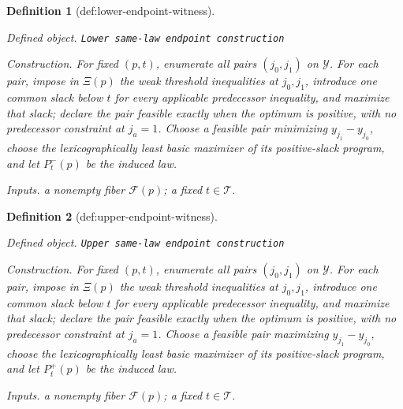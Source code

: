 \documentclass{article}
\newtheorem{definition}{Definition}
\begin{document}
\begin{definition}[def:lower-endpoint-witness]\label{def:lower-endpoint-witness}
\par\smallskip\noindent\emph{Defined object.} \texttt{Lower same-\allowbreak{}law endpoint construction}
\par\smallskip\noindent\emph{Construction.} For fixed \((p,t)\), enumerate all pairs \((j_0,j_1)\) on \(\mathcal Y\). For each pair, impose in \(\Xi(p)\) the weak threshold inequalities at \(j_0,j_1\), introduce one common slack below \(t\) for every applicable predecessor inequality, and maximize that slack; declare the pair feasible exactly when the optimum is positive, with no predecessor constraint at \(j_a=1\). Choose a feasible pair minimizing \(y_{j_1}-y_{j_0}\), choose the lexicographically least basic maximizer of its positive-slack program, and let \(P_t^-(p)\) be the induced law.
\par\smallskip\noindent\emph{Inputs.} a nonempty fiber \(\mathcal F(p)\); a fixed \(t\in\mathcal T\).
\end{definition}

\begin{definition}[def:upper-endpoint-witness]\label{def:upper-endpoint-witness}
\par\smallskip\noindent\emph{Defined object.} \texttt{Upper same-\allowbreak{}law endpoint construction}
\par\smallskip\noindent\emph{Construction.} For fixed \((p,t)\), enumerate all pairs \((j_0,j_1)\) on \(\mathcal Y\). For each pair, impose in \(\Xi(p)\) the weak threshold inequalities at \(j_0,j_1\), introduce one common slack below \(t\) for every applicable predecessor inequality, and maximize that slack; declare the pair feasible exactly when the optimum is positive, with no predecessor constraint at \(j_a=1\). Choose a feasible pair maximizing \(y_{j_1}-y_{j_0}\), choose the lexicographically least basic maximizer of its positive-slack program, and let \(P_t^+(p)\) be the induced law.
\par\smallskip\noindent\emph{Inputs.} a nonempty fiber \(\mathcal F(p)\); a fixed \(t\in\mathcal T\).
\end{definition}
\end{document}
